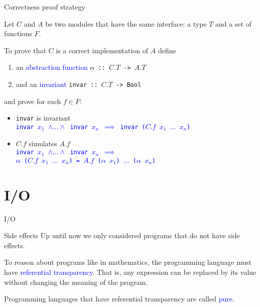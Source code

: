 \documentclass{beamer}
\def\code#1{\texttt{\frenchspacing#1}}
\begin{document}
\begin{frame}{Correctness proof strategy}

Let $C$ and $A$ be two modules that have the same interface: a type $T$ and a set of functions $F$.

\pause

To prove that $C$ is a correct implementation of $A$ define
\begin{enumerate}
    \item an \textcolor{blue}{abstraction function} \code{$\alpha$ :: $C.T$ -> $A.T$}
    \item and an \textcolor{blue}{invariant} \code{invar :: $C.T$ -> Bool}
\end{enumerate}
and prove for each $f \in F$:\pause
\begin{itemize}
    \item \code{invar} is invariant \\
        \textcolor{blue}{\code{invar $x_1$ $\land \dots \land$ invar $x_n$ $\implies$ invar ($C.f$ $x_1$ $\dots$ $x_n$)}}\pause
    \item $C.f$ simulates $A.f$ \\
        \textcolor{blue}{\code{invar $x_1$ $\land \dots \land$ invar $x_n$ $\implies$}} \\
        \textcolor{blue}{\code{$\alpha$ ($C.f$ $x_1$ $\dots$ $x_n$) = $A.f$ ($\alpha$ $x_1$) $\dots$ ($\alpha$ $x_n$)}}
\end{itemize}

\end{frame}

\section{I/O}

\begin{frame}{I/O}

\begin{block}{Side effects}
Up until now we only considered programs that do not have side effects.

\pause

To reason about programs like in mathematics, the programming language must have \textcolor{blue}{referential transparency}. That is, any expression can be replaced by its value without changing the meaning of the program.

\pause

Programming languages that have referential transparency are called \textcolor{blue}{pure}.
\end{block}

\end{frame}
\end{document}
